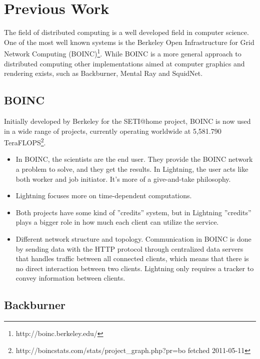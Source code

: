 \chapter{Previous Work}
The field of distributed computing is a well developed field in computer
science. One of the most well known systems is the Berkeley Open Infrastructure
for Grid Network Computing (BOINC)\footnote{http://boinc.berkeley.edu/}.
While BOINC is a more general approach to distributed computing other 
implementations aimed at computer graphics and rendering exists, such as Backburner, Mental Ray and SquidNet.


\section{BOINC}
Initially developed by Berkeley for the SETI@home project, BOINC is now used in
a wide range of projects, currently operating worldwide at 5,581.790 
TeraFLOPS\footnote{http://boincstats.com/stats/project\_graph.php?pr=bo 
fetched 2011-05-11}.

\begin{itemize}
	\item In BOINC, the scientists are the end user. They provide the BOINC network
		a problem to solve, and they get the results. In Lightning, 
		the user acts like both worker and job initiator. It’s more of a 
		give-and-take philosophy.
	\item Lightning focuses more on time-dependent computations.
	\item Both projects have some kind of ''credits'' system, but in Lightning
		''credits'' plays a bigger role in how much each client can utilize the service.
	\item Different network structure and topology. Communication in BOINC is done
		by sending data with the HTTP protocol through centralized data
		servers that handles traffic between all connected clients, which means 
		that there is no direct interaction between two clients. Lightning only
		requires a tracker to convey information between clients.
\end{itemize}

\section{Backburner}

